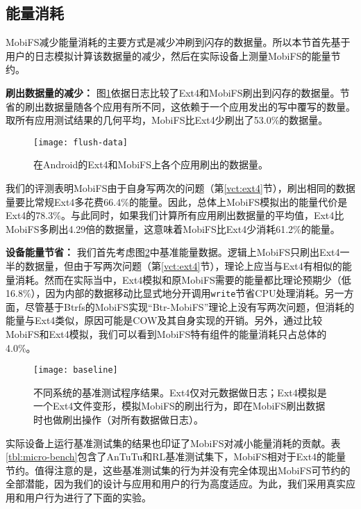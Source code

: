 \subsection{能量消耗} \label{vct:eval-energy}

MobiFS减少能量消耗的主要方式是减少冲刷到闪存的数据量。所以本节首先基于用户的日志模拟计算该数据量的减少，然后在实际设备上测量MobiFS的能量节约。

\noindent\textbf{刷出数据量的减少：}
图\ref{fig:flush-data}依据日志比较了Ext4和MobiFS刷出到闪存的数据量。节省的刷出数据量随各个应用有所不同，这依赖于一个应用发出的写中覆写的数量。取所有应用测试结果的几何平均，MobiFS比Ext4少刷出了53.0\%的数据量。

\begin{figure}[!ht]
  \centering
  \texttt{[image: flush-data]}
  \caption{在Android的Ext4和MobiFS上各个应用刷出的数据量。}
  \label{fig:flush-data}
\end{figure}

我们的评测表明MobiFS由于自身写两次的问题（第\ref{vct:ext4}节），刷出相同的数据量要比常规Ext4多花费66.4\%的能量。因此，总体上MobiFS模拟出的能量代价是Ext4的78.3\%。与此同时，如果我们计算所有应用刷出数据量的平均值，Ext4比MobiFS多刷出4.29倍的数据量，这意味着MobiFS比Ext4少消耗61.2\%的能量。

\noindent\textbf{设备能量节省：}
我们首先考虑图\ref{fig:baseline}中基准能量数据。逻辑上MobiFS只刷出Ext4一半的数据量，但由于写两次问题（第\ref{vct:ext4}节），理论上应当与Ext4有相似的能量消耗。然而在实际当中，Ext4模拟和原MobiFS需要的能量都比理论预期少（低16.8\%），因为内部的数据移动比显式地分开调用\texttt{write}节省CPU处理消耗。另一方面，尽管基于Btrfs的MobiFS实现“Btr-MobiFS”理论上没有写两次问题，但消耗的能量与Ext4类似，原因可能是COW及其自身实现的开销。另外，通过比较MobiFS和Ext4模拟，我们可以看到MobiFS特有组件的能量消耗只占总体的4.0\%。

\begin{figure}[!ht]
  \centering
  \texttt{[image: baseline]}
  \caption{不同系统的基准测试程序结果。Ext4仅对元数据做日志；Ext4模拟是一个Ext4文件变形，模拟MobiFS的刷出行为，即在MobiFS刷出数据时也做刷出操作（对所有数据做日志）。}
  \label{fig:baseline}
\end{figure}

实际设备上运行基准测试集的结果也印证了MobiFS对减小能量消耗的贡献。表\ref{tbl:micro-bench}包含了AnTuTu和RL基准测试集下，MobiFS相对于Ext4的能量节约。值得注意的是，这些基准测试集的行为并没有完全体现出MobiFS可节约的全部潜能，因为我们的设计与应用和用户的行为高度适应。为此，我们采用真实应用和用户行为进行了下面的实验。

